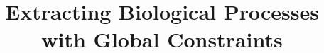\documentclass[11pt,letterpaper]{article}
\title{Extracting Biological Processes with Global Constraints}
\begin{document}
\maketitle

 
 \label{sec:intro}
 \label{sec:process}
 \label{sec:model}
 \label{sec:experiment}
 \label{sec:related}
 \label{sec:conclusion}




\end{document}
